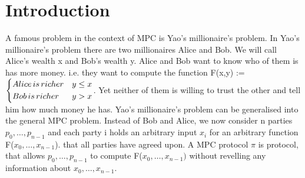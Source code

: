 \chapter {Introduction}
A famous problem in the context of MPC is Yao's millionaire's problem. In Yao's millionaire's problem there are two millionaires Alice and Bob. We will call Alice's wealth x and Bob's wealth y. Alice and Bob want to know who of them is has more money. i.e. they want to compute the function F(x,y) := $ 
\begin{dcases} 
	Alice \,  is \, richer   &  y \leq  x \\
	Bob \, is \, richer   &  y > x  \\
\end{dcases}  $. Yet neither of them is willing to trust the other and tell him how much money he has. 
Yao's millionaire's problem can be generalised into the general MPC problem.    Instead of Bob and Alice, we now consider n parties $ p_0,\dots,p_{n-1} $ and each party i holds an arbitrary input  $ x_i $ for an arbitrary function F($ x_0,\dots,x_{n-1}$).  that all parties have agreed upon.  
A MPC protocol $ \pi $  is protocol, that allows  $ p_0,\dots,p_{n-1} $ to compute F($ x_0,\dots,x_{n-1} )$ without revelling any information about $ x_0,\dots,x_{n-1}. $









